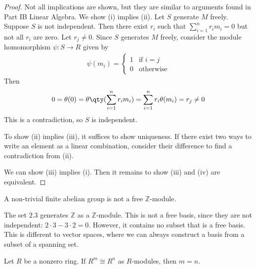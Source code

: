 \begin{proof}
	Not all implications are shown, but they are similar to arguments found in Part IB Linear Algebra.
	We show (i) implies (ii).
	Let $S$ generate $M$ freely.
	Suppose $S$ is not independent.
	Then there exist $r_i$ such that $\sum_{i=1}^n r_i m_i = 0$ but not all $r_i$ are zero.
	Let $r_j \neq 0$.
	Since $S$ generates $M$ freely, consider the module homomorphism $\psi \colon S \to R$ given by
	\begin{align*}
		\psi(m_i) = \begin{cases}
			1 & \text{if } i = j \\
			0 & \text{otherwise}
		\end{cases}
	\end{align*}
	Then
	\begin{align*}
		0 = \theta(0) = \theta\qty(\sum_{i=1}^n r_i m_i) = \sum_{i=1}^n r_i \theta(m_i) = r_j \neq 0
	\end{align*}
	This is a contradiction, so $S$ is independent.

	To show (ii) implies (iii), it suffices to show uniqueness.
	If there exist two ways to write an element as a linear combination, consider their difference to find a contradiction from (ii).

	We can show (iii) implies (i).
	Then it remains to show (iii) and (iv) are equivalent.
\end{proof}
\begin{example}
	A non-trivial finite abelian group is not a free $\mathbb Z$-module.

	The set $\qty{2,3}$ generates $\mathbb Z$ as a $\mathbb Z$-module.
	This is not a free basis, since they are not independent: $2 \cdot 3 - 3 \cdot 2 = 0$.
	However, it contains no subset that is a free basis.
	This is different to vector spaces, where we can always construct a basis from a subset of a spanning set.
\end{example}
\begin{proposition}
	Let $R$ be a nonzero ring.
	If $R^m \cong R^n$ as $R$-modules, then $m = n$.
\end{proposition}
